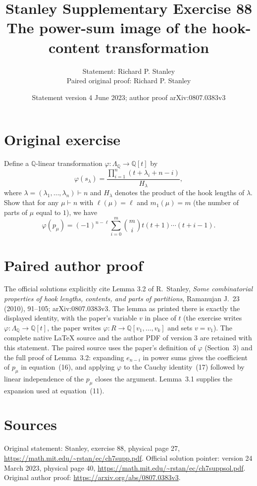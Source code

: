 \documentclass[11pt,a4paper]{article}
\title{Stanley Supplementary Exercise 88\\The power-sum image of the hook-content transformation}
\author{Statement: Richard P. Stanley\\Paired original proof: Richard P. Stanley}
\date{Statement version 4 June 2023; author proof arXiv:0807.0383v3}
\begin{document}
\maketitle
\section*{Original exercise}
Define a \(\mathbb{Q}\)-linear transformation \(\varphi:\Lambda_{\mathbb{Q}}\to\mathbb{Q}[t]\) by
\[
 \varphi(s_\lambda)=\frac{\prod_{i=1}^{n}(t+\lambda_i+n-i)}{H_\lambda},
\]
where \(\lambda=(\lambda_1,\dots,\lambda_n)\vdash n\) and \(H_\lambda\) denotes the product of the hook lengths of \(\lambda\).
Show that for any \(\mu\vdash n\) with \(\ell(\mu)=\ell\) and \(m_1(\mu)=m\) (the number of parts of \(\mu\) equal to \(1\)), we have
\[
 \varphi(p_\mu)=(-1)^{n-\ell}\sum_{i=0}^{m}\binom{m}{i}t(t+1)\cdots(t+i-1).
\]

\section*{Paired author proof}
The official solutions explicitly cite Lemma 3.2 of R.~Stanley, \emph{Some combinatorial
properties of hook lengths, contents, and parts of partitions}, Ramanujan J.~23 (2010),
91--105; arXiv:0807.0383v3. The lemma as printed there is exactly the displayed identity,
with the paper's variable \(v\) in place of \(t\) (the exercise writes \(\varphi:\Lambda_{\mathbb{Q}}\to\mathbb{Q}[t]\), the paper writes \(\varphi:R\to\mathbb{Q}[v_1,\dots,v_k]\) and sets \(v=v_1\)).
The complete native \LaTeX{} source and the author PDF of version 3 are retained with this statement.
The paired source uses the paper's definition of \(\varphi\) (Section~3) and the full proof of
Lemma~3.2: expanding \(e_{n-i}\) in power sums gives the coefficient of \(p_\mu\) in equation~(16),
and applying \(\varphi\) to the Cauchy identity~(17) followed by linear independence of the
\(p_\mu\) closes the argument. Lemma~3.1 supplies the expansion used at equation~(11).

\section*{Sources}
Original statement: Stanley, exercise 88, physical page 27,
\url{https://math.mit.edu/~rstan/ec/ch7supp.pdf}.
Official solution pointer: version 24 March 2023, physical page 40,
\url{https://math.mit.edu/~rstan/ec/ch7suppsol.pdf}.
Original author proof: \url{https://arxiv.org/abs/0807.0383v3}.
\end{document}
